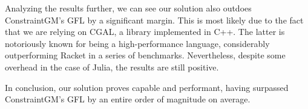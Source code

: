 Analyzing the results further, we can see our solution also outdoes
ConstraintGM's \ac{GFL} by a significant margin.  This is most likely due to the
fact that we are relying on \ac{CGAL}, a library implemented in C++.  The latter
is notoriously known for being a high-performance language, considerably
outperforming Racket in a series of benchmarks.  Nevertheless, despite some
overhead in the case of Julia, the results are still positive.

In conclusion, our solution proves capable and performant, having surpassed
ConstraintGM's \ac{GFL} by an entire order of magnitude on average.

